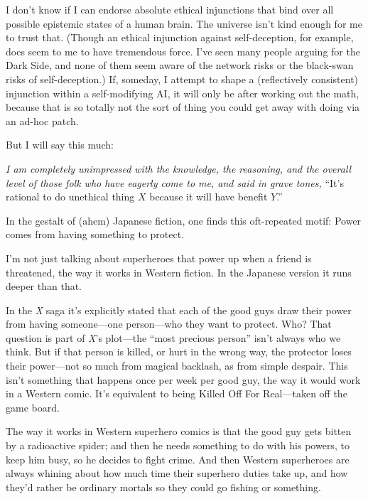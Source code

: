  I don't know if I can endorse absolute ethical
injunctions that bind over all possible epistemic states of a human
brain. The universe isn't kind enough for me to trust
that. (Though an ethical injunction against self-deception, for
example, does seem to me to have tremendous force. I've
seen many people arguing for the Dark Side, and none of them seem aware
of the network risks or the black-swan risks of self-deception.) If,
someday, I attempt to shape a (reflectively consistent) injunction
within a self-modifying AI, it will only be after working out the math,
because that is so totally not the sort of thing you could get away
with doing via an ad-hoc patch.


 But I will say this much:


 \textit{I am completely unimpressed with the knowledge, the
reasoning, and the overall level of those folk who have eagerly come to
me, and said in grave tones,} ``It's
rational to do unethical thing $X$ because it will have benefit
$Y$.''

\myendsectiontext




 In the gestalt of (ahem) Japanese fiction, one finds this
oft-repeated motif: Power comes from having something to protect. 


 I'm not just talking about superheroes that power
up when a friend is threatened, the way it works in Western fiction. In
the Japanese version it runs deeper than that.


 In the \textit{X} saga it's explicitly stated that
each of the good guys draw their power from having someone---one
person---who they want to protect. Who? That question is part of
\textit{X}'s plot---the ``most
precious person'' isn't always who we
think. But if that person is killed, or hurt in the wrong way, the
protector loses their power---not so much from magical backlash, as
from simple despair. This isn't something that happens
once per week per good guy, the way it would work in a Western comic.
It's equivalent to being Killed Off For Real{}---taken
off the game board.


 The way it works in Western superhero comics is that the good guy
gets bitten by a radioactive spider; and then he needs something to do
with his powers, to keep him busy, so he decides to fight crime. And
then Western superheroes are always whining about how much time their
superhero duties take up, and how they'd rather be
ordinary mortals so they could go fishing or something.


